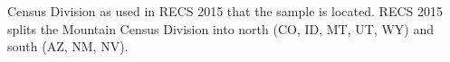 Census Division as used in RECS 2015 that the sample is located. RECS 2015 splits the Mountain Census Division into north (CO, ID, MT, UT, WY) and south (AZ, NM, NV).
